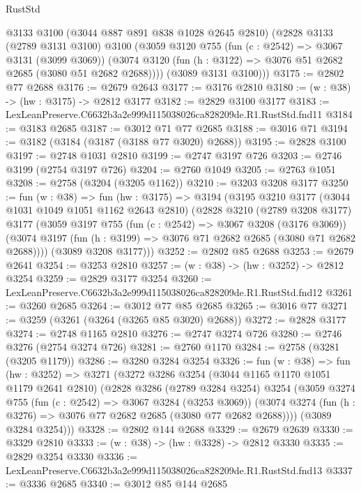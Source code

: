 \begin{lexlean}{RustStd}
\begin{coremodule}
      @3133
      @3100
      (@3044 @887 @891 @838 @1028 @2645 @2810)
      (@2828
        @3133
        (@2789 @3131 @3100)
        @3100
        (@3059
          @3120
          @755
          (fun (c : @2542) => @3067 @3131 (@3099 @3069))
          (@3074 @3120 (fun (h : @3122) => @3076 @51 @2682 @2685 (@3080 @51 @2682 @2688))))
        (@3089 @3131 @3100)))
@3175 := @2802 @77 @2688
@3176 := @2679 @2643
@3177 := @3176 @2810
@3180 := (w : @38) -> (hw : @3175) -> @2812 @3177
@3182 := @2829 @3100 @3177
@3183 := LexLeanPreserve.C6632b3a2e999d115038026ca828209de.R1.RustStd.fnd11
@3184 := @3183 @2685
@3187 := @3012 @71 @77 @2685
@3188 := @3016 @71
@3194 := @3182 (@3184 (@3187 (@3188 @77 @3020) @2688))
@3195 := @2828 @3100
@3197 := @2748 @1031 @2810
@3199 := @2747 @3197 @726
@3203 := @2746 @3199 (@2754 @3197 @726)
@3204 := @2760 @1049
@3205 := @2763 @1051
@3208 := @2758 (@3204 (@3205 @1162))
@3210 := @3203 @3208 @3177
@3250 := fun (w : @38) =>
  fun (hw : @3175) =>
  @3194
    (@3195
      @3210
      @3177
      (@3044 @1031 @1049 @1051 @1162 @2643 @2810)
      (@2828
        @3210
        (@2789 @3208 @3177)
        @3177
        (@3059
          @3197
          @755
          (fun (c : @2542) => @3067 @3208 (@3176 @3069))
          (@3074 @3197 (fun (h : @3199) => @3076 @71 @2682 @2685 (@3080 @71 @2682 @2688))))
        (@3089 @3208 @3177)))
@3252 := @2802 @85 @2688
@3253 := @2679 @2641
@3254 := @3253 @2810
@3257 := (w : @38) -> (hw : @3252) -> @2812 @3254
@3259 := @2829 @3177 @3254
@3260 := LexLeanPreserve.C6632b3a2e999d115038026ca828209de.R1.RustStd.fnd12
@3261 := @3260 @2685
@3264 := @3012 @77 @85 @2685
@3265 := @3016 @77
@3271 := @3259 (@3261 (@3264 (@3265 @85 @3020) @2688))
@3272 := @2828 @3177
@3274 := @2748 @1165 @2810
@3276 := @2747 @3274 @726
@3280 := @2746 @3276 (@2754 @3274 @726)
@3281 := @2760 @1170
@3284 := @2758 (@3281 (@3205 @1179))
@3286 := @3280 @3284 @3254
@3326 := fun (w : @38) =>
  fun (hw : @3252) =>
  @3271
    (@3272
      @3286
      @3254
      (@3044 @1165 @1170 @1051 @1179 @2641 @2810)
      (@2828
        @3286
        (@2789 @3284 @3254)
        @3254
        (@3059
          @3274
          @755
          (fun (c : @2542) => @3067 @3284 (@3253 @3069))
          (@3074 @3274 (fun (h : @3276) => @3076 @77 @2682 @2685 (@3080 @77 @2682 @2688))))
        (@3089 @3284 @3254)))
@3328 := @2802 @144 @2688
@3329 := @2679 @2639
@3330 := @3329 @2810
@3333 := (w : @38) -> (hw : @3328) -> @2812 @3330
@3335 := @2829 @3254 @3330
@3336 := LexLeanPreserve.C6632b3a2e999d115038026ca828209de.R1.RustStd.fnd13
@3337 := @3336 @2685
@3340 := @3012 @85 @144 @2685

\end{coremodule}
\end{lexlean}

